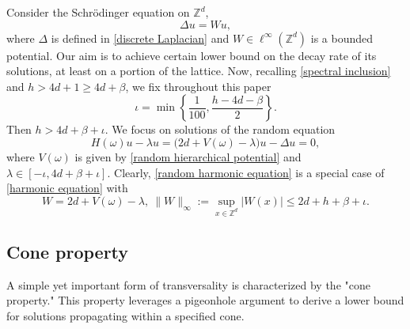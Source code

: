 \documentclass[11pt,reqno,UTF8,twoside]{amsart}
\newcommand{\Z}{\mathbb{Z}}
\theoremstyle{definition}
\numberwithin{equation}{section}
\begin{document}
Consider the  Schr\"odinger equation on $\mathbb{Z}^d$,
\begin{equation}\label{harmonic equation}
\Delta u = W u,
\end{equation}
where $\Delta$ is  defined in \eqref{discrete Laplacian} and $W \in \ell^\infty(\mathbb{Z}^d)$ is a bounded potential. Our aim is to achieve certain  lower bound on the decay rate of its solutions, at least on a portion of the lattice. 
Now,  recalling  \eqref{spectral inclusion} and $h>4d+1\geq 4d+\beta$, we  fix throughout this paper 
\begin{equation}\label{iota}
  \iota = \min\left\{\frac{1}{100} , \frac{h-4d-\beta}{2} \right\}.
\end{equation}
Then $h>4d+\beta+\iota$. We focus on solutions  of  the random equation
\begin{equation}\label{random harmonic equation}
H(\omega)u - \lambda u = \big(2d + V(\omega) - \lambda\big)u - \Delta u = 0,
\end{equation}
where $V(\omega)$ is given by \eqref{random hierarchical potential} and $\lambda \in [-\iota, 4d+\beta+\iota]$. Clearly, \eqref{random harmonic equation} is a special case of \eqref{harmonic equation} with
\[W=2d+V(\omega)-\lambda,\  \| W\|_{\infty}:=\sup_{x\in\Z^d}|W(x)|\leq 2d+h+\beta+ \iota .\]








\subsection{Cone property}
A simple yet important form of transversality is characterized by the "cone property." This property leverages a pigeonhole argument to derive a lower bound for solutions propagating within a specified cone.
\end{document}
